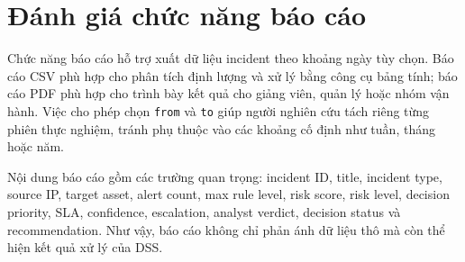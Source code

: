 \documentclass[a4paper,12pt,oneside]{book}
\begin{document}
\section{Đánh giá chức năng báo cáo}
{\fontsize{13pt}{15.6pt}\selectfont

Chức năng báo cáo hỗ trợ xuất dữ liệu incident theo khoảng ngày tùy chọn. Báo cáo CSV phù hợp cho phân tích định lượng và xử lý bằng công cụ bảng tính; báo cáo PDF phù hợp cho trình bày kết quả cho giảng viên, quản lý hoặc nhóm vận hành. Việc cho phép chọn \texttt{from} và \texttt{to} giúp người nghiên cứu tách riêng từng phiên thực nghiệm, tránh phụ thuộc vào các khoảng cố định như tuần, tháng hoặc năm.

\noindent Nội dung báo cáo gồm các trường quan trọng: incident ID, title, incident type, source IP, target asset, alert count, max rule level, risk score, risk level, decision priority, SLA, confidence, escalation, analyst verdict, decision status và recommendation. Như vậy, báo cáo không chỉ phản ánh dữ liệu thô mà còn thể hiện kết quả xử lý của DSS.

}
\end{document}
